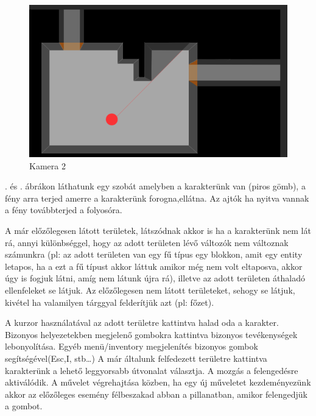 \begin{figure}[!ht]
	\centering
	\includegraphics[scale=1]{images/image7.png}
	\caption{Kamera 2}
	\label{fig:camera2}
\end{figure}

. és . ábrákon láthatunk egy szobát amelyben a karakterünk van (piros gömb), a fény arra terjed amerre a karakterünk forogna,ellátna.
Az ajtók ha nyitva vannak a fény továbbterjed a folyosóra.

A már előzőlegesen látott területek, látszódnak akkor is ha a karakterünk nem lát rá, annyi különbséggel, hogy az adott területen lévő változók nem változnak számunkra (pl: az adott területen van egy fű típus egy blokkon, amit egy entity letapos, ha a ezt a fű típust akkor láttuk amikor még nem volt eltaposva, akkor úgy is fogjuk látni, amíg nem látunk újra rá), illetve az adott területen áthaladó ellenfeleket se látjuk.
Az előzőlegesen nem látott területeket, sehogy se látjuk, kivétel ha valamilyen tárggyal felderítjük azt (pl: főzet).




A kurzor használatával az adott területre kattintva halad oda a karakter.
Bizonyos helyezetekben megjelenő gombokra kattintva bizonyos tevékenységek lebonyolítása.
Egyéb menü/inventory megjelenítés bizonyos gombok segítségével(Esc,I, stb…)
A már általunk felfedezett területre kattintva karakterünk a lehető leggyorsabb útvonalat választja.
A mozgás a felengedésre aktiválódik.
A művelet végrehajtása közben, ha egy új műveletet kezdeményezünk akkor az előzőleges esemény félbeszakad abban a pillanatban, amikor felengedjük a gombot.

